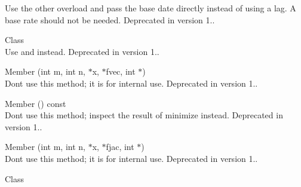 \begin{DoxyRefList}
\label{deprecated__deprecated000128}%
%
Use the other overload and pass the base date directly instead of using a lag. A base rate should not be needed. Deprecated in version 1..  
\item[Class \doxylink{class_quant_lib_1_1_kirk_spread_option_engine}{Quant\+Lib\+::Kirk\+Spread\+Option\+Engine} ]\hfill \\
\label{deprecated__deprecated000021}%
%
Use  and  instead. Deprecated in version 1..  
\item[Member \doxylink{class_quant_lib_1_1_levenberg_marquardt_a2a285512371fe68a12cbcbd04f3cac01}{Quant\+Lib\+::Levenberg\+Marquardt\+::fcn} (int m, int n, \doxylink{namespace_quant_lib_a372ac5c1a422a6b276fe0552d4d83f50}{Real} \texorpdfstring{$\ast$}{*}x, \doxylink{namespace_quant_lib_a372ac5c1a422a6b276fe0552d4d83f50}{Real} \texorpdfstring{$\ast$}{*}fvec, int \texorpdfstring{$\ast$}{*})]\hfill \\
\label{deprecated__deprecated000107}%
%
Don\textquotesingle{}t use this method; it is for internal use. Deprecated in version 1..  
\item[Member \doxylink{class_quant_lib_1_1_levenberg_marquardt_ad2292fe3d7ef8ccda0f79b21ea2cc359}{Quant\+Lib\+::Levenberg\+Marquardt\+::get\+Info} () const]\hfill \\
\label{deprecated__deprecated000106}%
%
Don\textquotesingle{}t use this method; inspect the result of minimize instead. Deprecated in version 1..  
\item[Member \doxylink{class_quant_lib_1_1_levenberg_marquardt_a777d790ccfd8d2146c1f0ead95824c7b}{Quant\+Lib\+::Levenberg\+Marquardt\+::jac\+Fcn} (int m, int n, \doxylink{namespace_quant_lib_a372ac5c1a422a6b276fe0552d4d83f50}{Real} \texorpdfstring{$\ast$}{*}x, \doxylink{namespace_quant_lib_a372ac5c1a422a6b276fe0552d4d83f50}{Real} \texorpdfstring{$\ast$}{*}fjac, int \texorpdfstring{$\ast$}{*})]\hfill \\
\label{deprecated__deprecated000108}%
%
Don\textquotesingle{}t use this method; it is for internal use. Deprecated in version 1..  
\item[Class \doxylink{class_quant_lib_1_1_log_grid}{Quant\+Lib\+::Log\+Grid} ]\hfill \\

\end{DoxyRefList}

